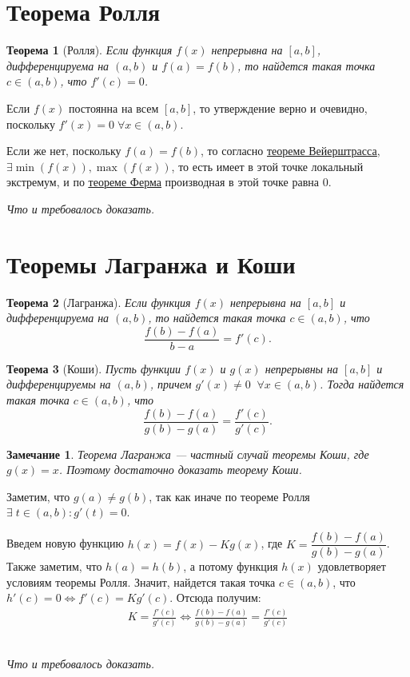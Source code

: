 \documentclass[a4paper,12pt,oneside]{extbook}
\newcommand{\newpar}{$ $\par\nobreak\ignorespaces}
\theoremstyle{numbered}
\theoremstyle{unnumbered}
\newtheorem*{theorem*}{Теорема}
\theoremstyle{named}
\theoremstyle{unnumbered}
\theoremstyle{named}
\theoremstyle{named}
\theoremstyle{named}
\newtheorem*{note}{Замечание}
\renewenvironment{proof}[1][]{\breakenv[Доказательство]{\if\relax\detokenize{#1}\relax\else\;\fi}{\textbf{#1}}}{\smallskip\newpar \hfill\textit{Что и требовалось доказать.}}
\newcommand{\plink}[2]{\hyperref[#1]{\color{blue}\underline{#2}}}
\begin{document}
\section{Теорема Ролля}%
\label{sec:Теорема Ролля}
\begin{theorem*}[Ролля]
    Если функция \(f(x)\) непрерывна на \([a, b]\), дифференцируема на \((a, b)\) и \(f(a) = f(b)\), то найдется такая точка \(c \in (a, b)\), что \(f'(c) = 0\).
\end{theorem*}

\begin{proof}
    Если \(f(x)\) постоянна на всем \([a, b]\), то утверждение верно и очевидно, поскольку \(f'(x) = 0 \; \forall x \in (a, b)\).

    Если же нет, поскольку \(f(a) = f(b)\), то согласно \plink{sec:Теорема Вейерштрасса о достижении максимума и минимума}{теореме Вейерштрасса}, \(\exists \min{(f(x)), \max{(f(x))}}\), то есть имеет в этой точке локальный экстремум, и по \plink{theorem:Теорема Ферма}{теореме Ферма} производная в этой точке равна 0.
\end{proof}

\section{Теоремы Лагранжа и Коши}%
\label{sec:Теоремы Лагранжа и Коши}
\begin{theorem*}[Лагранжа]
    \label{theorem:Теорема Лагранжа}
    Если функция \(f(x)\) непрерывна на \([a, b]\) и дифференцируема на \((a, b)\), то найдется такая точка \(c \in (a, b)\), что
    \[
        \frac{f(b) - f(a)}{b - a} = f'(c).
    \]
\end{theorem*}

\begin{theorem*}[Коши]
    Пусть функции \(f(x)\) и \(g(x)\) непрерывны на \([a, b]\) и дифференцируемы на \((a, b)\), причем \(g'(x) \neq 0 \;\; \forall x \in (a, b)\). Тогда найдется такая точка \(c \in (a, b)\), что
    \[
        \frac{f(b) - f(a)}{g(b) - g(a)} = \frac{f'(c)}{g'(c)}.
    \]
\end{theorem*}

\begin{note}
    Теорема Лагранжа — частный случай теоремы Коши, где \(g(x) = x\). Поэтому достаточно доказать теорему Коши.
\end{note}

\begin{proof}[теоремы Коши]
    Заметим, что \(g(a) \neq g(b)\), так как иначе по теореме Ролля \(\exists \; t \in (a, b): g'(t) = 0\).

    Введем новую функцию \(h(x) = f(x) - Kg(x)\), где \(K = \dfrac{f(b) - f(a)}{g(b) - g(a)}\). Также заметим, что \(h(a) = h(b)\), а потому функция \(h(x)\) удовлетворяет условиям теоремы Ролля. Значит, найдется такая точка \(c \in (a, b)\), что \(h'(c) = 0 \iff f'(c) = Kg'(c)\). Отсюда получим:
    \begin{gather*}
        K = \frac{f'(c)}{g'(c)} \iff \frac{f(b) - f(a)}{g(b) - g(a)} = \frac{f'(c)}{g'(c)}
    \end{gather*}
\end{proof}
\end{document}
